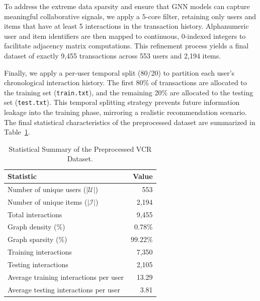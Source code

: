 To address the extreme data sparsity and ensure that GNN models can capture meaningful collaborative signals, we apply a $5$-core filter, retaining only users and items that have at least 5 interactions in the transaction history. Alphanumeric user and item identifiers are then mapped to continuous, 0-indexed integers to facilitate adjacency matrix computations. This refinement process yields a final dataset of exactly 9,455 transactions across 553 users and 2,194 items.

Finally, we apply a per-user temporal split (80/20) to partition each user's chronological interaction history. The first 80\% of transactions are allocated to the training set (\texttt{train.txt}), and the remaining 20\% are allocated to the testing set (\texttt{test.txt}). This temporal splitting strategy prevents future information leakage into the training phase, mirroring a realistic recommendation scenario. The final statistical characteristics of the preprocessed dataset are summarized in Table~\ref{tab:dataset_stats}.

\begin{table}[H]
\centering
\caption{Statistical Summary of the Preprocessed VCR Dataset.}
\label{tab:dataset_stats}
\begin{tabular}{lr}
\hline
\textbf{Statistic} & \textbf{Value} \\ \hline
Number of unique users ($|\mathcal{U}|$) & 553 \\
Number of unique items ($|\mathcal{I}|$) & 2,194 \\
Total interactions & 9,455 \\
Graph density (\%) & $0.78\%$ \\
Graph sparsity (\%) & $99.22\%$ \\
Training interactions & 7,350 \\
Testing interactions & 2,105 \\
Average training interactions per user & 13.29 \\
Average testing interactions per user & 3.81 \\ \hline
\end{tabular}
\end{table}
